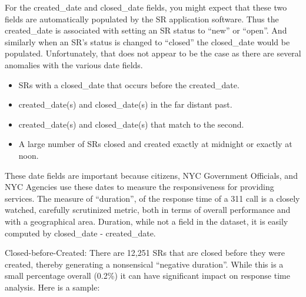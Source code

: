\documentclass[12pt, titlepage]{article}
\begin{document}
\label{sec:negativeduration}
For the created\_date and closed\_date fields, you might 
expect that these two fields are automatically populated by the 
SR application software. Thus the created\_date is associated with setting an SR status 
to ``new'' or ``open''. And similarly when an SR's 	status is 
changed to ``closed''  the closed\_date would be 
populated. Unfortunately, that does not appear to be the case as
there are several anomalies with the various date fields.
	
\begin{itemize}
	\item SRs with a closed\_date that occurs before the created\_date.
 	\item created\_date(s) and closed\_date(s) in the far distant past.
 	\item created\_date(s) and closed\_date(s) that match to the second.
	\item A large number of SRs closed and created exactly at midnight 
	or exactly at noon. 
\end{itemize}
	
These date fields are important because citizens, NYC Government Officials, 
and NYC Agencies use these dates to measure the 
responsiveness for providing services. The measure of ``duration'',	 
of the response time of a 311 call is a closely 
watched, carefully scrutinized metric, both in terms of overall performance 
and with a geographical area. Duration, while not a field in the dataset, 
it is easily computed by closed\_date - created\_date.
	
Closed-before-Created:  There are 12,251 SRs that are closed before they 
were created, thereby generating a nonsensical ``negative duration''. 
While this is a small percentage overall (0.2\%) it can have significant impact 
on response time analysis. Here is a sample:
\end{document}
